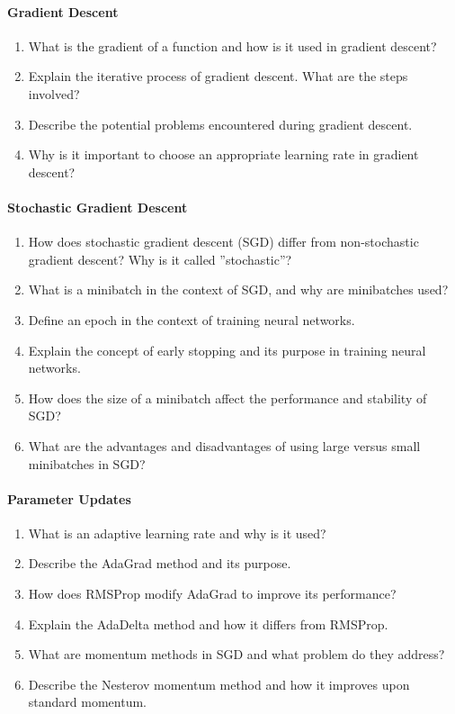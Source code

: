\paragraph*{Gradient Descent}
\begin{enumerate}
    \item What is the gradient of a function and how is it used in gradient descent?
    \item Explain the iterative process of gradient descent. What are the steps involved?
    \item Describe the potential problems encountered during gradient descent.
    \item Why is it important to choose an appropriate learning rate in gradient descent?
\end{enumerate}
\paragraph*{Stochastic Gradient Descent}
\begin{enumerate}
    \item How does stochastic gradient descent (SGD) differ from non-stochastic gradient descent? Why is it called ''stochastic''?
    \item What is a minibatch in the context of SGD, and why are minibatches used?
    \item Define an epoch in the context of training neural networks.
    \item Explain the concept of early stopping and its purpose in training neural networks.
    \item How does the size of a minibatch affect the performance and stability of SGD?
    \item What are the advantages and disadvantages of using large versus small minibatches in SGD?
\end{enumerate}
\paragraph*{Parameter Updates}
\begin{enumerate}
    \item What is an adaptive learning rate and why is it used?
    \item Describe the AdaGrad method and its purpose.
    \item How does RMSProp modify AdaGrad to improve its performance?
    \item Explain the AdaDelta method and how it differs from RMSProp.
    \item What are momentum methods in SGD and what problem do they address?
    \item Describe the Nesterov momentum method and how it improves upon standard momentum.
\end{enumerate}
